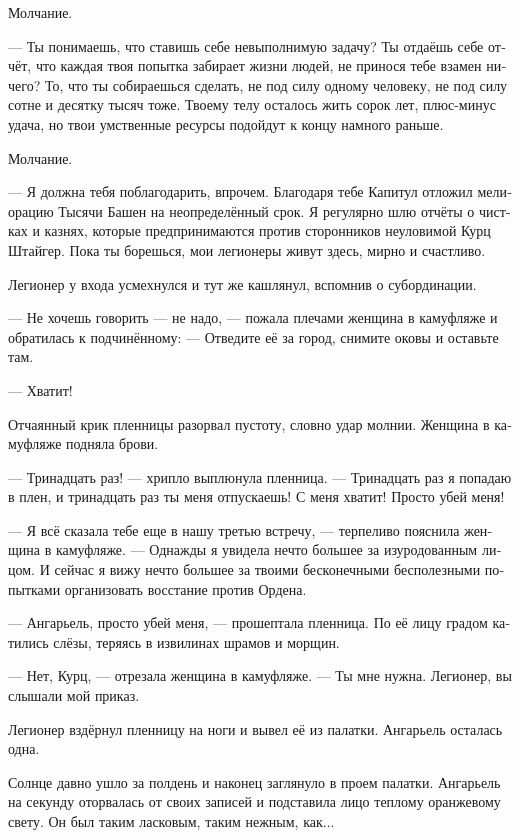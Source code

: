 \documentclass[a4paper,12pt,fleqn]{book}\usepackage{polyglossia}\setdefaultlanguage[babelshorthands=true]{russian}\setotherlanguage{english}\defaultfontfeatures{Ligatures=TeX,Mapping=tex-text}\usepackage{xcolor}\newcommand{\ml}[3]{#2}
\begin{document}
Молчание.

--- Ты понимаешь, что ставишь себе невыполнимую задачу?
Ты отдаёшь себе отчёт, что каждая твоя попытка забирает жизни людей, не принося тебе взамен ничего?
То, что ты собираешься сделать, не под силу одному человеку, не под силу сотне и десятку тысяч тоже.
Твоему телу осталось жить сорок лет, плюс-минус удача, но твои умственные ресурсы подойдут к концу намного раньше.

Молчание.

\ml{$0$}
{--- Я должна тебя поблагодарить, впрочем.}
{``I owe you appreciation, though.}
\ml{$0$}
{Благодаря тебе Капитул отложил мелиорацию Тысячи Башен на неопределённый срок.}
{Because of you, Capitul had postponed melioration of Thousand Towers indefinitely.}
Я регулярно шлю отчёты о чистках и казнях, которые предпринимаются против сторонников неуловимой Курц Штайгер.
\ml{$0$}
{Пока ты борешься, мои легионеры живут здесь, мирно и счастливо.}
{While you're fighting, my leggionaires live their best life here, in peace.''}

Легионер у входа усмехнулся и тут же кашлянул, вспомнив о субординации.

--- Не хочешь говорить --- не надо, --- пожала плечами женщина в камуфляже и обратилась к подчинённому:
--- Отведите её за город, снимите оковы и оставьте там.

--- Хватит!

Отчаянный крик пленницы разорвал пустоту, словно удар молнии.
Женщина в камуфляже подняла брови.

--- Тринадцать раз! --- хрипло выплюнула пленница.
--- Тринадцать раз я попадаю в плен, и тринадцать раз ты меня отпускаешь!
С меня хватит!
Просто убей меня!

--- Я всё сказала тебе еще в нашу третью встречу, --- терпеливо пояснила женщина в камуфляже.
--- Однажды я увидела нечто большее за изуродованным лицом.
И сейчас я вижу нечто большее за твоими бесконечными бесполезными попытками организовать восстание против Ордена.

--- Ангарьель, просто убей меня, --- прошептала пленница.
По её лицу градом катились слёзы, теряясь в извилинах шрамов и морщин.

--- Нет, Курц, --- отрезала женщина в камуфляже.
--- Ты мне нужна.
Легионер, вы слышали мой приказ.

Легионер вздёрнул пленницу на ноги и вывел её из палатки.
Ангарьель осталась одна.

Солнце давно ушло за полдень и наконец заглянуло в проем палатки.
Ангарьель на секунду оторвалась от своих записей и подставила лицо теплому оранжевому свету.
Он был таким ласковым, таким нежным, как...
\end{document}
